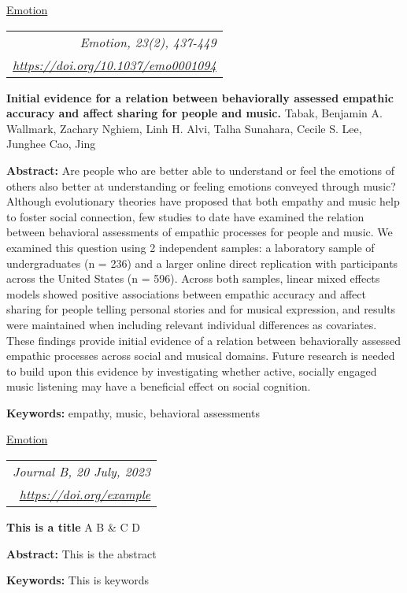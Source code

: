 \documentclass{eclab-beamer}
\begin{document}
\begin{frame}[allowframebreaks]{\color{black} \normalsize{\ul{Emotion}} \hfill
\begin{tabular}{r}
\textit{Emotion, 23(2), 437-449}\\
\href{https://doi.org/10.1037/emo0001094}{\color{blue} \footnotesize{\ul{\textit{https://doi.org/10.1037/emo0001094}}}}
\end{tabular}}

\textbf{\Large{Initial evidence for a relation between behaviorally assessed empathic accuracy and affect sharing for people and music.}}
\vspace{1mm}
Tabak, Benjamin A. Wallmark, Zachary Nghiem, Linh H. Alvi, Talha Sunahara, Cecile S. Lee, Junghee Cao, Jing

\hspace*{\fill}


\textbf{Abstract:}
Are people who are better able to understand or feel the emotions of others also better at understanding or feeling emotions conveyed through music? Although evolutionary theories have proposed that both empathy and music help to foster social connection, few studies to date have examined the relation between behavioral assessments of empathic processes for people and music. We examined this question using 2 independent samples: a laboratory sample of undergraduates (n = 236) and a larger online direct replication with participants across the United States (n = 596). Across both samples, linear mixed effects models showed positive associations between empathic accuracy and affect sharing for people telling personal stories and for musical expression, and results were maintained when including relevant individual differences as covariates. These findings provide initial evidence of a relation between behaviorally assessed empathic processes across social and musical domains. Future research is needed to build upon this evidence by investigating whether active, socially engaged music listening may have a beneficial effect on social cognition.

\textbf{Keywords:} empathy, music, behavioral assessments
\end{frame}
\begin{frame}[allowframebreaks]{\color{black} \normalsize{\ul{Emotion}} \hfill
\begin{tabular}{r}
\textit{Journal B, 20 July, 2023}\\
\href{https://doi.org/example}{\color{blue} \footnotesize{\ul{\textit{https://doi.org/example}}}}
\end{tabular}}

\textbf{\Large{This is a title}}
\vspace{1mm}
A B \& C D

\hspace*{\fill}


\textbf{Abstract:}
This is the abstract

\textbf{Keywords:} This is keywords
\end{frame}
\end{document}
